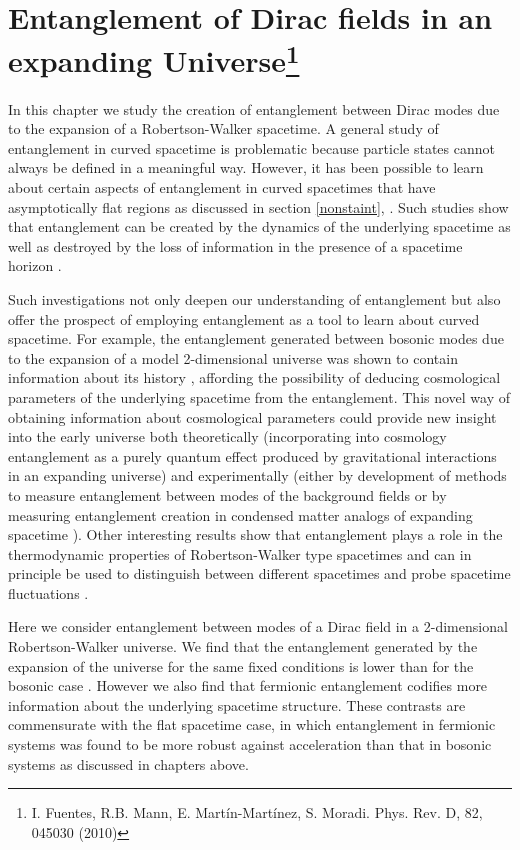\chapter{Entanglement of Dirac fields in an expanding Universe\footnote{I. Fuentes, R.B. Mann, E. Mart\'in-Mart\'inez, S. Moradi. Phys. Rev. D, 82, 045030 (2010)}}\label{expandingU}




In this chapter we study the creation of entanglement
between Dirac modes due to the expansion of a Robertson-Walker spacetime.
A general study of entanglement  in curved spacetime is problematic because particle states cannot always be defined in a meaningful way. However,
 it has been possible
 to learn about certain aspects of entanglement in curved spacetimes
that have asymptotically flat regions as discussed in section \ref{nonstaint}, \cite{caball,schacross,ShiYu,TeraUeda2}. Such
studies show that entanglement can be created by the dynamics of the
 underlying spacetime \cite{caball,Steeg} as well as destroyed by the loss of
information in the presence of a spacetime horizon \cite{Alicefalls,schacross}.

Such investigations not only deepen our understanding of entanglement but also offer the prospect of employing entanglement as a tool to learn about curved spacetime.  For example, the entanglement generated between bosonic modes due to the expansion of a model 2-dimensional universe was shown to contain information about its history \cite{caball}, affording the
possibility of deducing cosmological parameters of the underlying
spacetime from the entanglement. This novel way of obtaining
information about cosmological parameters could provide new insight into
the early universe  both theoretically (incorporating into cosmology entanglement as a purely quantum effect produced by gravitational interactions in an expanding universe) and experimentally (either by development of methods to measure entanglement between modes of the background fields or by measuring entanglement creation in  condensed matter analogs of expanding  spacetime \cite{analog1,analog2}). Other interesting results show that entanglement plays a role
in the thermodynamic properties of Robertson-Walker type spacetimes
\cite{Lousto} and can in principle be used to distinguish between different spacetimes
 \cite{Steeg} and probe spacetime fluctuations \cite{dowling}.
 

Here we consider entanglement between modes of a Dirac field in
a  2-dimensional Robertson-Walker universe.  We find
that the entanglement generated by the expansion of the
universe for the same fixed conditions is lower than for the bosonic case \cite{caball}.
However we also find that fermionic entanglement  codifies more information about the underlying spacetime structure. These contrasts are commensurate with 
the flat spacetime case, in which entanglement in fermionic systems was found to
be more robust against acceleration than that in bosonic systems
as discussed in chapters above.




